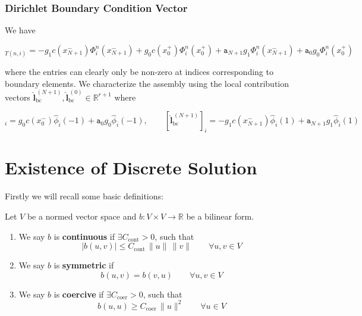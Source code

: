 \subsubsection{Dirichlet Boundary Condition Vector}
We have

\begin{equation*}
	[\textbf{l}_{\text{bc}}]_{T(n,i)} =
	-g_1c(x_{N+1}^-)\Phi_i^n(x_{N+1}^-) + g_0c(x_0^+)\Phi_i^n(x_0^+)
	+ \texttt{a}_{N+1}g_1\Phi_i^n(x_{N+1}^-) + \texttt{a}_0 g_0\Phi_i^n(x_{0}^+)
\end{equation*}

where the entries can clearly only be non-zero at indices corresponding to
boundary elements.
We characterize the assembly using the local contribution vectors
$\widehat{\textbf{l}}_{\text{bc}}^{\,(N+1)}, \widehat{\textbf{l}}_{\text{bc}}^{\,(0)} \in \mathbb{R}^{r+1}$
where

\begin{equation*}
	[\widehat{\textbf{l}}_{\text{bc}}^{\,(0)}]_{i} = g_0c(x_{0}^-) \widehat{\phi}_i(-1) + \texttt{a}_{0}g_0\widehat{\phi}_i(-1), \qquad
	[\widehat{\textbf{l}}_{\text{bc}}^{\,(N+1)}]_{i} = -g_1c(x_{N+1}^-) \widehat{\phi}_i(1) + \texttt{a}_{N+1}g_1\widehat{\phi}_i(1)
\end{equation*}

\section{Existence of Discrete Solution}
\label{sec:existence_uniqueness_elliptic_discrete_problem}
Firstly we will recall some basic definitions:
\begin{definition} Let $V$ be a normed vector space and $b:V\times V \to \mathbb{R}$
	be a bilinear form.
	\begin{enumerate}[label=\textnormal{(\roman*)}]
		\item We say $b$ is \textbf{continuous} if $\exists C_{\text{cont}}>0$, such that
		      \[
			      |b(u,v)|\leq C_{\text{cont}}\, \|u\|\, \|v\| \qquad \forall u,v \in V
		      \]
		\item We say $b$ is \textbf{symmetric} if
		      \[
			      b(u,v) = b(v,u) \qquad \forall u,v \in V
		      \]
		\item We say $b$ is \textbf{coercive} if $\exists C_{\text{coer}}>0$, such that
		      \[
			      b(u,u)\geq C_{\text{coer}}\, \|u\|^2 \qquad \forall u \in V
		      \]
	\end{enumerate}
\end{definition}


